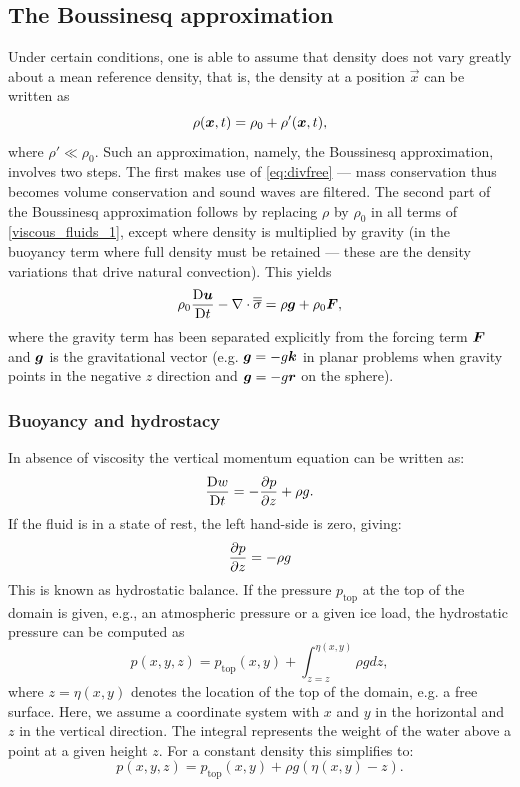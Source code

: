 \subsection{The Boussinesq approximation} \label{sec:boussinesq_approximation}

Under certain conditions, one is able to assume that density does not vary greatly about a mean reference density, that is, the density at a position $\vec x$ can be written as
\begin{equation}
\rho(\bmx,t) = \rho_0 + \rho'(\bmx,t),
\end{equation}
where $\rho'\ll\rho_0$. Such an approximation, namely, the Boussinesq
approximation, involves two steps. The first makes use of \eqref{eq:divfree} ---
mass conservation thus becomes volume conservation and sound waves are filtered.
The second part of the Boussinesq approximation follows by replacing $\rho$ by
$\rho_0$ in all terms of \eqref{viscous_fluids_1}, except where density is
multiplied by gravity (\ie in the buoyancy term where full density must be retained --- these are the density variations that drive natural convection). This yields
\begin{equation}
\rho_0\DDt{\bmu} -\nabla\cdot\sigtens = \rho \bmg + \rho_0\bmF,
\end{equation}
where the gravity term has been separated explicitly from the forcing term $\bmF$ and $\bmg$ is the gravitational vector (e.g. $\bmg = -g\bmk$ in planar problems when gravity points in the negative $z$ direction and $\bmg = -g\vec r$ on the sphere).

\subsubsection{Buoyancy and hydrostacy}\label{sec:buoyancy_hydrostacy}
In absence of viscosity the vertical momentum equation can be written as:
\begin{equation}\label{eq:vertmom}
\DDt[t]{w} = -\ppx[z]{p} + \rho g.
\end{equation}
If the fluid is in a state of rest, the left hand-side is zero, giving:
\begin{equation}\label{eq:hydrostatic_balance}
\ppx[z]{p} = -\rho g
\end{equation}
This is known as hydrostatic balance. If the pressure $p_{\text{top}}$ at the top of the domain
is given, e.g., an atmospheric pressure or a given ice load, 
the hydrostatic pressure can be computed as
\begin{equation}
  p(x,y,z) = p_{\text{top}}(x,y) + \int_{z=z}^{\eta(x,y)} \rho g dz,
\end{equation}
where $z=\eta(x,y)$ denotes the location of the top of the domain, e.g. a free
surface. Here, we assume a coordinate system with $x$ and $y$ in the horizontal
and $z$ in the vertical direction. The integral represents the weight of the
water above a point at a given height $z$. For a constant density this simplifies to:
\begin{equation}
  p(x,y,z) = p_{\text{top}}(x,y) + \rho g \left(\eta(x,y)-z\right).
\end{equation}


